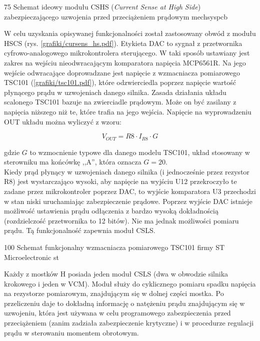 	{75}
	{Schemat ideowy modułu CSHS ({\it Current Sense at High Side}) zabezpieczającego uzwojenia przed przeciążeniem prądowym}
	{mechsyspcb}
	
W celu uzyskania opisywanej funkcjonalności został zastosowany obwód z modułu HSCS (rys. \ref{grafiki/cursens_hs.pdf}). Etykieta DAC to sygnał z przetwornika cyfrowo-analogowego mikrokontrolera sterującego. W taki sposób ustawiany jest zakres na wejściu nieodwracającym komparatora napięcia MCP6561R. Na jego wejście odwracające doprowadzane jest napięcie z wzmacniacza pomiarowego TSC101 (\ref{grafiki/tsc101.pdf}), które odzwierciedla poprzez napięcie wartość płynącego prądu w uzwojeniach danego silnika. Zasada działania układu scalonego TSC101 bazuje na zwierciadle prądowym. Może on być zasilany z napięcia niższego niż te, które trafia na jego wejścia. Napięcie na wyprowadzeniu OUT układu można wyliczyć z wzoru:

\begin{equation} \label{eq:mainboard1}
	V_{OUT} = R8 \cdot I_{R8} \cdot G
\end{equation}

gdzie $ G $ to wzmocnienie typowe dla danego modelu TSC101, układ stosowany w sterowniku ma końcówkę ,,A'', która oznacza $ G = 20 $. \\

Kiedy prąd płynący w uzwojeniach danego silnika (i jednocześnie przez rezystor R8) jest wystarczająco wysoki, aby napięcie na wyjściu U12 przekroczyło te zadane przez mikrokontroler poprzez DAC, to wyjście komparatora U3 przechodzi w stan niski uruchamiając zabezpieczenie prądowe. Poprzez wyjście DAC istnieje możliwość ustawienia prądu odłączenia z bardzo wysoką dokładnością (rozdzielczość przetwornika to 12 bitów). Nie ma jednak możliwości pomiaru prądu. Tą funkcjonalność zapewnia moduł CSLS.

	{100}
	{Schemat funkcjonalny wzmacniacza pomiarowego TSC101 firmy ST Microelectronic}
	{st}


Każdy z mostków H posiada jeden moduł CSLS (dwa w obwodzie silnika krokowego i jeden w VCM). Moduł służy do cyklicznego pomiaru spadku napięcia na rezystorze pomiarowym, znajdującym się w dolnej części mostka. Po przeliczeniu daje to dokładną informację o natężeniu prądu znajdującym się w uzwojeniu, która jest używana w celu programowego zabezpieczenia przed przeciążeniem (zanim zadziała zabezpieczenie krytyczne) i w procedurze regulacji prądu w sterowaniu momentem obrotowym. \\

